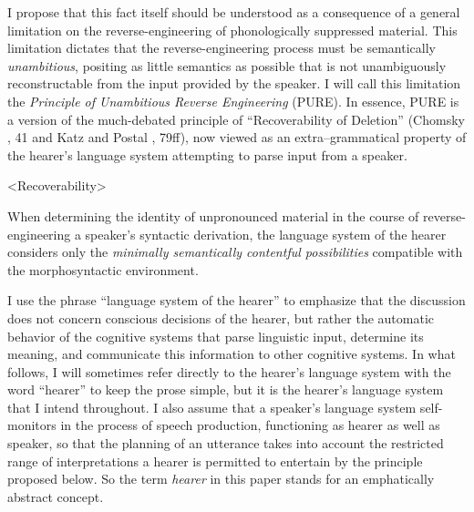 \documentclass[output=paper]{langscibook}
\begin{document}
\noindent I propose that this fact itself should be understood as a consequence of a general limitation on the reverse-engineering of phonologically suppressed material. This limitation dictates that the reverse-engineering process must be semantically \textit{unambitious}, positing as little semantics as possible that is not unambiguously reconstructable from the input provided by the speaker. I will call this limitation the \textit{Principle of Unambitious Reverse Engineering} (PURE). In essence, PURE is a version of the much-debated principle of “Recoverability of Deletion” (Chomsky \citeyear{Chomsky1964c}, 41 and Katz and Postal \citeyear{Katz:1964}, 79ff), now viewed as an extra--grammatical property of the hearer's language system attempting to parse input from a speaker. 

\pex<Recoverability>

When determining the identity of unpronounced material in the course of reverse-engineering a speaker's syntactic derivation, the language system of the hearer considers only the \textit{minimally semantically contentful possibilities} compatible with the morphosyntactic environment. 
\xe

I use the phrase “language system of the hearer” to emphasize that the discussion does not concern conscious decisions of the hearer, but rather the automatic behavior of the cognitive systems that parse linguistic input, determine its meaning, and communicate this information to other cognitive systems. In what follows, I will sometimes refer directly to the hearer's language system with the word “hearer” to keep the prose simple, but it is the hearer's language system that I intend throughout. I also assume that a speaker's language system self-monitors in the process of speech production, functioning as hearer as well as speaker, so that the planning of an utterance takes into account the restricted range of interpretations a hearer is permitted to entertain by the principle proposed below. So the term \textit{hearer} in this paper stands for an emphatically abstract concept. 
\end{document}
